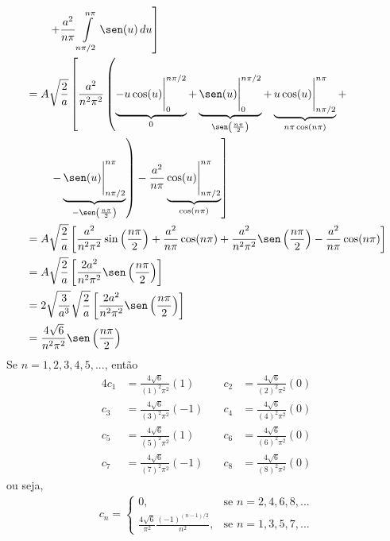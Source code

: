 \begin{prob}
\begin{sol}
\begin{enumerate}[label=\alph *)]
\begin{align}
\begin{split}
									& \left. \qquad +\frac{a^{2}}{n \pi}\int\limits_{n \pi/2}^{n \pi}\sen(u)\,d{u}\right]\\
									&= A\sqrt{\frac{2}{a}}\left[\frac{a^{2}}{n^{2} \pi^{2}}\left(\underbrace{-u\cos(u)\Bigg|_{0}^{n \pi/2}}_{0}+\underbrace{\sen(u)\Bigg|_{0}^{n \pi/2}}_{\sen \left(\frac{n \pi}{2}\right)}+\underbrace{u\cos(u)\Bigg|_{n \pi/2}^{n \pi}}_{n \pi\cos(n \pi)}+\right.\right.\\
									&\left.\left.\qquad -\underbrace{\sen(u)\Bigg|_{n \pi/2}^{n \pi}}_{-\sen \left(\frac{n \pi}{2}\right)}\right)-\frac{a^{2}}{n \pi}\underbrace{\cos(u)\Bigg|_{n \pi/2}^{n \pi} }_{\cos(n \pi)} \right]\\
									&= A\sqrt{\frac{2}{a}} \left[\frac{a^{2}}{n^{2} \pi^{2}}\sin \left(\frac{n \pi}{2}\right)+\frac{a^{2}}{n \pi}\cos(n \pi)+\frac{a^{2}}{n^{2} \pi^{2}}\sen \left(\frac{n \pi}{2}\right)-\frac{a^{2}}{n \pi}\cos(n \pi)\right]\\
									&= A\sqrt{\frac{2}{a}} \left[\frac{2a^{2}}{n^{2} \pi^{2}}\sen \left(\frac{n \pi}{2}\right)\right]\\
									&= 2\sqrt{\frac{3}{a^{3}}}\sqrt{\frac{2}{a}}\left[\frac{2a^{2}}{n^{2} \pi^{2}}\sen \left(\frac{n \pi}{2}\right)\right]\\
									&= \frac{4\sqrt{6}}{n^{2} \pi^{2}}\sen \left(\frac{n \pi}{2}\right)
					\end{split}
				\end{align}
				Se $n=1,2,3,4,5,...$, então
				\begin{alignat*}{4}
					c_{1} &= \frac{4\sqrt{6}}{(1)^{2} \pi^{2}}(1) &\quad c_{2} &= \frac{4\sqrt{6}}{(2)^{2} \pi^{2}}(0)\\
					c_{3} &= \frac{4\sqrt{6}}{(3)^{2} \pi^{2}}(-1) &\quad c_{4} &= \frac{4\sqrt{6}}{(4)^{2} \pi^{2}}(0)\\
					c_{5} &= \frac{4\sqrt{6}}{(5)^{2} \pi^{2}}(1) &\quad c_{6} &= \frac{4\sqrt{6}}{(6)^{2} \pi^{2}}(0)\\
					c_{7} &= \frac{4\sqrt{6}}{(7)^{2} \pi^{2}}(-1) &\quad c_{8} &= \frac{4\sqrt{6}}{(8)^{2} \pi^{2}}(0)
				\end{alignat*}
				ou seja,
				\begin{align}
					c_{n} = 
					\begin{cases}
						\displaystyle{0}, &\text{se $n=2,4,6,8,...$}\\
						\displaystyle\frac{4\sqrt{6}}{\pi^{2}}\frac{(-1)^{(n-1)/2}}{n^{2}}, &\text{se $n=1,3,5,7,...$}
					\end{cases}
				\end{align}

\end{enumerate}
\end{sol}
\end{prob}
